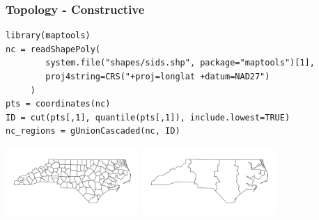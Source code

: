 \documentclass[slidestop,mathserif]{beamer}
\begin{document}
\begin{frame}[fragile]
\frametitle{Topology - Constructive}
\begin{example}
{\scriptsize
\begin{verbatim}
library(maptools)
nc = readShapePoly(
        system.file("shapes/sids.shp", package="maptools")[1], 
        proj4string=CRS("+proj=longlat +datum=NAD27")
     )
pts = coordinates(nc)
ID = cut(pts[,1], quantile(pts[,1]), include.lowest=TRUE)
nc_regions = gUnionCascaded(nc, ID)
\end{verbatim}
% 
%
}
\end{example}

\begin{center}
\includegraphics[width=2in]{Figures/nc.pdf} \pause
\includegraphics[width=2in]{Figures/nc_regions.pdf}
\end{center}

\end{frame}

\end{document}
